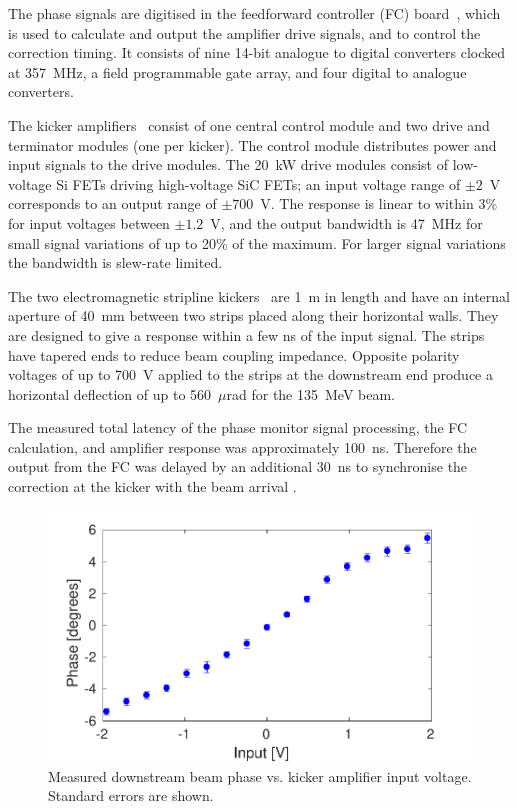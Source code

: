 \documentclass[%
 reprint,
 superscriptaddress,
 amsmath,
 amssymb,
 prl,
]{revtex4-1}
\begin{document}
The phase signals are digitised  in the feedforward controller (FC) 
board~\cite{RobertsThesis}, which is used to calculate and output the amplifier 
drive signals, and to  control the correction timing. It consists of nine 
14-bit analogue to digital converters clocked at 357~MHz, a field programmable 
gate array, and four digital to analogue converters. 

The kicker amplifiers~\cite{RobertsThesis} consist of one central control 
module and two drive and terminator modules (one per kicker). The control 
module distributes power and input signals to the 
drive modules. The 20~kW drive modules consist of low-voltage Si FETs driving 
high-voltage SiC FETs; an input voltage range of \(\pm2\)~V corresponds to an 
output range of \(\pm700\)~V. The response is linear to within 3\% for input 
voltages between \(\pm1.2\)~V, and the output bandwidth is 47~MHz for small 
signal variations of up to 20\% of the maximum. For larger signal variations 
the bandwidth is slew-rate limited.

The two electromagnetic stripline kickers~\cite{kickerIPAC11} are 1~m in length 
and have an internal aperture of 40~mm between two strips placed along their 
horizontal walls. They are designed to give a response within a few ns of the 
input signal. The strips have tapered ends to reduce beam coupling impedance. 
Opposite polarity voltages of up to 700~V applied to the 
strips at the downstream end produce a horizontal deflection of up to 
560~\(\mu\)rad for the 135~MeV beam.

The measured total latency of the phase monitor signal processing, the FC 
calculation, and amplifier response was approximately 100~ns. Therefore the 
output from the FC was delayed by an additional 30~ns to synchronise the 
correction at the kicker with the beam arrival \cite{RobertsThesis}.

\begin{figure}
	\includegraphics[width=\columnwidth]{figs/corrRange}
	\caption{\label{fig:corrRange}Measured downstream beam phase vs. kicker 
	amplifier input voltage. Standard errors are shown.}
\end{figure}
\end{document}
